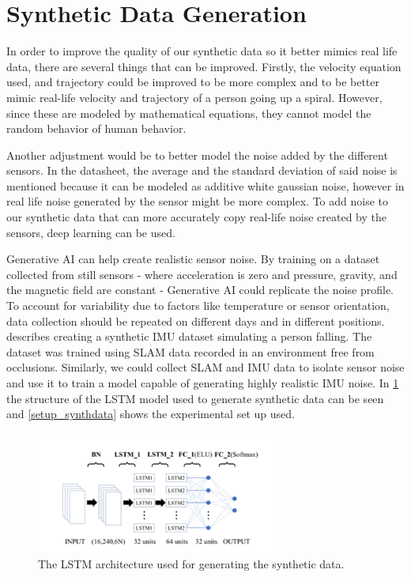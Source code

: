 \section{Synthetic Data Generation}
In order to improve the quality of our synthetic data so it better mimics real life data, there are several things that can be improved.
Firstly, the velocity equation used, and trajectory could be improved to be more complex and to be better mimic real-life velocity and trajectory of a person going up a spiral. However, since these are modeled by mathematical equations, they cannot model the random behavior of human behavior. 
\par
Another adjustment would be to better model the noise added by the different sensors. In the datasheet, the average and the standard deviation of said noise is mentioned because it can be modeled as additive white gaussian noise, however in real life noise generated by the sensor might be more complex. To add noise to our synthetic data that can more accurately copy real-life noise created by the sensors, deep learning can be used. 
\par
Generative AI can help create realistic sensor noise. By training on a dataset collected from still sensors - where acceleration is zero and pressure, gravity, and the magnetic field are constant - Generative AI could replicate the noise profile. To account for variability due to factors like temperature or sensor orientation, data collection should be repeated on different days and in different positions. 
\cite{tang_2024_synthetic} describes creating a synthetic IMU dataset simulating a person falling. The dataset was trained using SLAM data recorded in an environment free from occlusions. Similarly, we could collect SLAM and IMU data to isolate sensor noise and use it to train a model capable of generating highly realistic IMU noise. In \cref{LSTM_synthdata} the structure of the LSTM model used to generate synthetic data can be seen and \cref{setup_synthdata} shows the experimental set up used.
\begin{figure}[h] 
	\centering \includegraphics[height=4cm]{./images/LSTMsynth.png}
	\caption{The LSTM architecture used for generating the synthetic data.}
	\label{LSTM_synthdata}
\end{figure}
